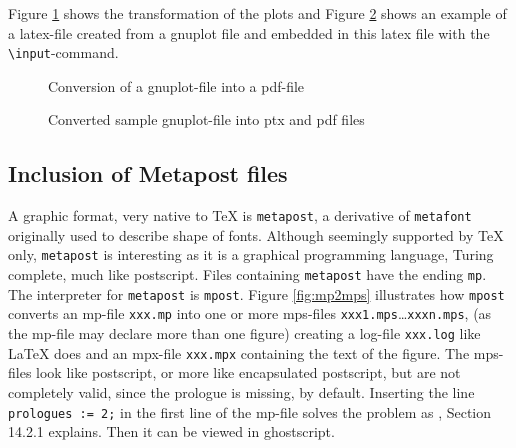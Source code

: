 \documentclass[12pt]{article}
\begin{document}
Figure \ref{fig:plt2pdf} shows the transformation of the plots 
and Figure \ref{fig:gnuplot} shows an example of a latex-file 
created from a gnuplot file 
and embedded in this latex file with the {\tt\textbackslash input}-command. 

\begin{figure}[htb]
\begin{center}

\end{center}
\caption{\label{fig:plt2pdf}Conversion of a gnuplot-file into a pdf-file}
\end{figure}

\begin{figure}[htb]
\begin{center}

\end{center}
\caption{\label{fig:gnuplot}
Converted sample gnuplot-file into ptx and pdf files }
\end{figure}


\subsection{Inclusion of Metapost files}\label{subsec:metapost}

A graphic format, very native to TeX is {\tt metapost}, 
a derivative of {\tt metafont} originally used to describe shape of fonts. 
Although seemingly supported by TeX only, 
{\tt metapost} is interesting as it is a graphical programming language, 
Turing complete, much like postscript. 
Files containing {\tt metapost} have the ending {\tt mp}. 
The interpreter for {\tt metapost} is {\tt mpost}. 
Figure \ref{fig:mp2mps} illustrates how {\tt mpost} converts an \gls{mp}-file 
{\tt xxx.mp} 
into one or more \gls{mps}-files {\tt xxx1.mps}\dots {\tt xxxn.mps}, 
(as the mp-file may declare more than one figure) 
creating a log-file {\tt xxx.log} like LaTeX does 
and an \gls{mpx}-file {\tt xxx.mpx} containing the text of the figure. 
The mps-files look like postscript, or more like encapsulated postscript, 
but are not completely valid, since the prologue is missing, by default. 
Inserting the line {\tt prologues := 2;} in the first line of the mp-file 
solves the problem as \cite{MPost}, Section 14.2.1 explains. 
Then it can be viewed in ghostscript. 
\end{document}
